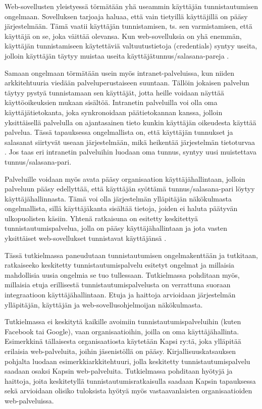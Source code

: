 Web-sovellusten yleistyessä törmätään yhä useammin käyttäjän tunnistautumisen ongelmaan. Sovelluksen tarjoaja haluaa, että vain tietyillä käyttäjillä on pääsy järjestelmään. Tämä vaatii käyttäjän tunnistamisen, ts. sen varmistamisen, että käyttäjä on se, joka väittää olevansa. Kun web-sovelluksia on yhä enemmän, käyttäjän tunnistamiseen käytettäviä valtuutustietoja (credentials) syntyy useita, jolloin käyttäjän täytyy muistaa useita käyttäjätunnus/salasana-pareja \cite{billion_keys}.

Samaan ongelmaan törmätään usein myös intranet-palveluissa, kun niiden arkkitehtuuria viedään palveluperustaiseen suuntaan. Tällöin jokaisen palvelun täytyy pystyä tunnistamaan sen käyttäjät, jotta heille voidaan näyttää käyttöoikeuksien mukaan sisältöä. Intranetin palveluilla voi olla oma käyttäjätietokanta, joka synkronoidaan päätietokannan kanssa, jolloin yksittäisellä palvelulla on ajantasainen tieto kunkin käyttäjän oikeudesta käyttää palvelua. Tässä tapauksessa ongelmallista on, että käyttäjän tunnukset ja salasanat siirtyvät useaan järjestelmään, mikä heikentää järjestelmän tietoturvaa \cite{nisti}. Jos taas eri intranetin palveluihin luodaan oma tunnus, syntyy uusi muistettava tunnus/salasana-pari.

Palveluille voidaan myös avata pääsy organisaation käyttäjähallintaan, jolloin palveluun pääsy edellyttää, että käyttäjän syöttämä tunnus/salasana-pari löytyy käyttäjähallinnasta. Tämä voi olla järjestelmän ylläpitäjän näkökulmasta ongelmallista, sillä käyttäjäkanta sisältää tietoja, joiden ei haluta päätyvän ulkopuolisten käsiin. Yhtenä ratkaisuna on esitetty keskitettyä tunnistautumispalvelua, jolla on pääsy käyttäjähallintaan ja jota vasten yksittäiset web-sovellukset tunnistavat käyttäjänsä \cite{nisti}.

Tässä tutkielmassa paneudutaan tunnistautumisen ongelmakenttään ja tutkitaan, ratkaiseeko keskitetty tunnistautumispalvelu esitetyt ongelmat ja millaisia mahdollisia uusia ongelmia se tuo tullessaan. Tutkielmassa pohditaan myös, millaisia etuja erillisestä tunnistautumispalvelusta on verrattuna suoraan integraatioon käyttäjähallintaan. Etuja ja haittoja arvioidaan järjestelmän ylläpitäjän, käyttäjän ja web-sovellusohjelmoijan näkökulmasta.

Tutkielmassa ei keskitytä kaikille avoimiin tunnistautumispalveluihin (kuten Facebook tai Google), vaan organisaatioihin, joilla on oma käyttäjähallinta. Esimerkkinä tällaisesta organisaatiosta käytetään Kapsi ry:tä, joka ylläpitää erilaisia web-palveluita, joihin jäsenistöllä on pääsy. Kirjallisuuskatsauksen pohjalta luodaan esimerkkiarkkitehtuuri, jolla keskitetty tunnistautumispalvelu saadaan osaksi Kapsin web-palveluita. Tutkielmassa pohditaan hyötyjä ja haittoja, joita keskitetyllä tunnistautumisratkaisulla saadaan Kapsin tapauksessa sekä arvioidaan olisiko tuloksista hyötyä myös vastaavanlaisten organisaatioiden web-palveluissa.


